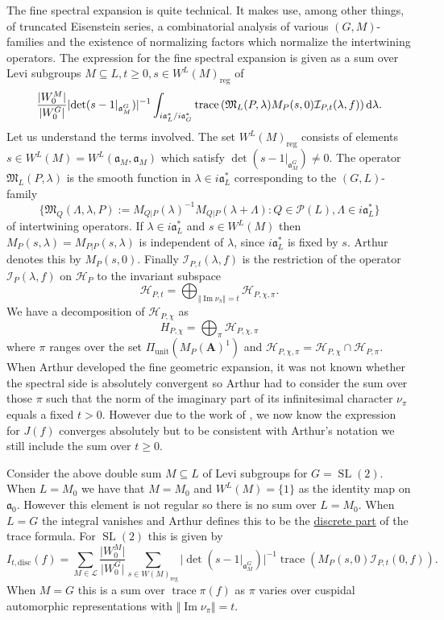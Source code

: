 \documentclass[11pt]{amsart}
\def\A{\mathbf A}
\def\HHH{\mathcal H}
\def\III{\mathcal I}
\def\LLL{\mathcal L}
\def\MMM{\mathfrak M}	%
\def\PPP{\mathcal P}
\def\aaa{\mathfrak a}
\def\cb#1{{\color{black}#1}}
\def\d{\text d}
\def\det{\operatorname{det}}
\def\disc{\text{disc}}
\def\Im{\operatorname{Im}}
\def\mod#1{\lvert #1 \rvert} %
\def\norm#1{\Vert #1 \Vert} %
\def\reg{\operatorname{reg}}
\def\sl{\operatorname{SL}}
\def\trace{\operatorname{trace}}
\def\unit{\operatorname{unit}}
\theoremstyle{remark}
\begin{document}
The fine spectral expansion is quite technical. It makes use, among other things, of truncated Eisenstein series, a combinatorial analysis of various $(G, M)$-families and the existence of normalizing factors which normalize the intertwining operators. The expression for the fine spectral expansion is given as a sum over Levi subgroups $M \subseteq L, t \geq 0, s \in W^L(M)_{\reg}$ of 
\[ 
	\frac{\mod{W_0^M}}{\mod{W_0^G}} \mod{\det(s - 1|_{\aaa_M^G})}^{-1} 
		\int_{i\aaa_L^* / i\aaa_G^*} \trace \left( \MMM_L(P, \lambda) M_P(s, 0) \III_{P, t}(\lambda, f) \right) \d \lambda. 
\]
Let us understand the terms involved. The set $W^L(M)_{\reg}$ consists of elements $s \in W^L(M) = W^L(\aaa_M, \aaa_M)$ which satisfy $\det(s-1|_{\aaa_M^G}) \neq 0$. The operator $\MMM_L(P, \lambda)$ is the smooth function in $\lambda \in i\aaa_L^*$ corresponding to the $(G, L)$-family 
\[ \{ \MMM_Q(\Lambda, \lambda, P) := M_{Q|P}(\lambda)^{-1} M_{Q|P}(\lambda + \Lambda) : Q \in \PPP(L), \Lambda \in i\aaa_L^* \} \]
of intertwining operators. If $\lambda \in i\aaa_L^*$ and $s \in W^L(M)$ then $M_P(s, \lambda) = M_{P|P}(s, \lambda)$ is independent of $\lambda$, since $i\aaa_L^*$ is fixed by $s$. Arthur denotes this by $M_P(s, 0)$. Finally $\III_{P, t}(\lambda, f)$ is the restriction of the operator $\III_P(\lambda, f)$ on $\HHH_P$ to the invariant subspace 
\[ \HHH_{P, t} = \bigoplus_{\norm{\Im \nu_\pi} = t} \HHH_{P, \chi, \pi}. \]
We have a decomposition of $\HHH_{P, \chi}$ as
\[ H_{P, \chi} = \bigoplus_\pi \HHH_{P, \chi, \pi} \]
where $\pi$ ranges over the set $\Pi_{\unit}(M_P(\A)^1)$ and $\HHH_{P, \chi, \pi} = \HHH_{P, \chi} \cap \HHH_{P, \pi}$. When Arthur developed the fine geometric expansion, it was not known whether the spectral side is absolutely convergent so Arthur had to consider the sum over those $\pi$ such that the norm of the imaginary part of its infinitesimal character $\nu_\pi$ equals a fixed $t > 0$. However due to the work of \cite{FLM}, we now know the expression for $J(f)$ converges absolutely but to be consistent with Arthur's notation we still include the sum over $t \geq 0$. 

\cb{Consider the above double sum $M\subseteq L$ of Levi subgroups for $G = \sl(2)$. When $L = M_0$ we have that $M=M_0$ and $W^L(M) = \{1\}$ as the identity map on $\aaa_0$. However this element is not regular so there is no sum over $L=M_0$. When $L=G$ the integral vanishes and Arthur defines this to be the \underline{discrete part} of the trace formula. For $\sl(2)$ this is given by
\[ I_{t, \disc}(f) = \sum_{M \in \LLL} \frac{\mod{W_0^M}}{\mod{W_0^G}} \sum_{s \in W(M)_{\reg}} \mod{\det(s-1|_{\aaa_M^G})}^{-1} \trace\left(M_P(s, 0) \III_{P, t}(0, f) \right). \]
When $M=G$ this is a sum over $\trace \pi(f)$ as $\pi$ varies over cuspidal automorphic representations with $\norm{\Im \nu_\pi} = t$. 
}
\end{document}
